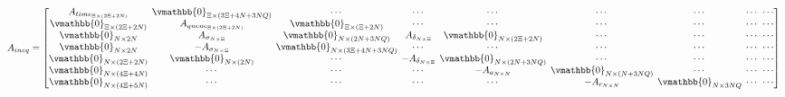 \documentclass[letterpaper, 10pt, conference]{IEEEtran}
\begin{document}
\begin{table}[!t]
\begin{equation}
\setlength{\arraycolsep}{2pt}
\renewcommand{\arraystretch}{0.8}
\begin{array}{c}
    A_{ineq} =
    \begin{bmatrix}
	A_{time_{\Xi \times (2\Xi + 2N)}}    & \vmathbb{0}_{\Xi \times (3\Xi + 4N + 3NQ)} & \cdots                                   & \cdots                     & \cdots                             & \cdots                           & \cdots                     & \cdots                & \cdots                    \\
	\vmathbb{0}_{\Xi \times (2\Xi + 2N)} & A_{queue_{\Xi \times (2\Xi + 2N)}}         & \vmathbb{0}_{\Xi \times (\Xi + 2N)}      & \cdots                     & \cdots                             & \cdots                           & \cdots                     & \cdots                & \cdots                    \\
	\vmathbb{0}_{N \times 2N}            & A_{\sigma_{N \times \Xi}}                  & \vmathbb{0}_{N \times (2N + 3NQ)}        & A_{\delta_{N \times \Xi}}  & \vmathbb{0}_{N \times (2\Xi + 2N)} & \cdots                           & \cdots                     & \cdots                & \cdots                    \\
	\vmathbb{0}_{N \times 2N}            & -A_{\sigma_{N \times \Xi}}                 & \vmathbb{0}_{N \times (3\Xi + 4N + 3NQ)} & \cdots                     & \cdots                             & \cdots                           & \cdots                     & \cdots                & \cdots                    \\
	\vmathbb{0}_{N \times (2\Xi + 2N)}   & \vmathbb{0}_{N \times (2N)}                & \cdots                                   & -A_{\delta_{N \times \Xi}} & \vmathbb{0}_{N \times (2N + 3NQ)}  & \cdots                           & \cdots                     & \cdots                & \cdots                    \\
	\vmathbb{0}_{N \times (4\Xi + 4N)}   & \cdots                                     & \cdots                                   & \cdots                     & -A_{a_{N \times N}}                & \vmathbb{0}_{N \times (N + 3NQ)} & \cdots                     & \cdots                & \cdots                    \\
	\vmathbb{0}_{N \times (4\Xi + 5N)}   & \cdots                                     & \cdots                                   & \cdots                     & \cdots                             & -A_{c_{N \times N}}              & \vmathbb{0}_{N \times 3NQ} & \cdots                & \cdots                    \\

\end{bmatrix}
\end{array}
\end{equation}
\end{table}
\end{document}
